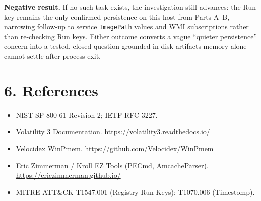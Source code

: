 \documentclass[11pt,letterpaper]{article}
\newcommand{\labpart}[1]{%
  \par\vspace{0.35em}%
  \Needspace{8\baselineskip}%
  \section*{#1}%
  \nopagebreak
}
\begin{document}
\textbf{Negative result.} If no such task exists, the investigation still advances:
the Run key remains the only confirmed persistence on this host from Parts A--B,
narrowing follow-up to service \texttt{ImagePath} values and WMI subscriptions
rather than re-checking Run keys. Either outcome converts a vague ``quieter
persistence'' concern into a tested, closed question grounded in disk artifacts
memory alone cannot settle after process exit.

\labpart{6. References}

\begin{itemize}
  \item NIST SP 800-61 Revision 2; IETF RFC 3227.
  \item Volatility 3 Documentation. \url{https://volatility3.readthedocs.io/}
  \item Velocidex WinPmem. \url{https://github.com/Velocidex/WinPmem}
  \item Eric Zimmerman / Kroll EZ Tools (PECmd, AmcacheParser). \url{https://ericzimmerman.github.io/}
  \item MITRE ATT\&CK T1547.001 (Registry Run Keys); T1070.006 (Timestomp).
\end{itemize}
\end{document}
